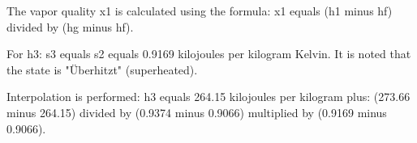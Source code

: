 The vapor quality x1 is calculated using the formula:  
x1 equals (h1 minus hf) divided by (hg minus hf).  

For h3:  
s3 equals s2 equals 0.9169 kilojoules per kilogram Kelvin.  
It is noted that the state is "Überhitzt" (superheated).  

Interpolation is performed:  
h3 equals 264.15 kilojoules per kilogram plus:  
(273.66 minus 264.15) divided by (0.9374 minus 0.9066) multiplied by (0.9169 minus 0.9066).